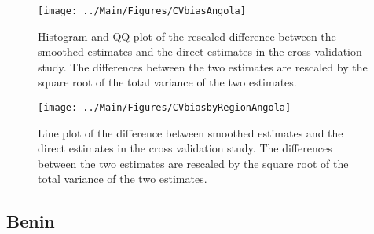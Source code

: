 \documentclass[12pt]{article}\usepackage[]{graphicx}\usepackage[]{color}
\newenvironment{knitrout}{}{} %
\begin{document}
\begin{knitrout}
\color{fgcolor}\begin{figure}[bht]

{\centering \texttt{[image: ../Main/Figures/CVbiasAngola]} 

}

\caption[Histogram and QQ-plot of the rescaled difference between the smoothed estimates and the direct estimates in the cross validation study]{Histogram and QQ-plot of the rescaled difference between the smoothed estimates and the direct estimates in the cross validation study. The differences between the two estimates are rescaled by the square root of the total variance of the two estimates.}\label{fig:unnamed-chunk-9}
\end{figure}


\end{knitrout}

\begin{knitrout}
\color{fgcolor}\begin{figure}[bht]

{\centering \texttt{[image: ../Main/Figures/CVbiasbyRegionAngola]} 

}

\caption[Line plot of the difference between smoothed estimates and the direct estimates in the cross validation study]{Line plot of the difference between smoothed estimates and the direct estimates in the cross validation study. The differences between the two estimates are rescaled by the square root of the total variance of the two estimates.}\label{fig:unnamed-chunk-10}
\end{figure}


\end{knitrout}


\clearpage
\subsection{Benin}


\end{document}
